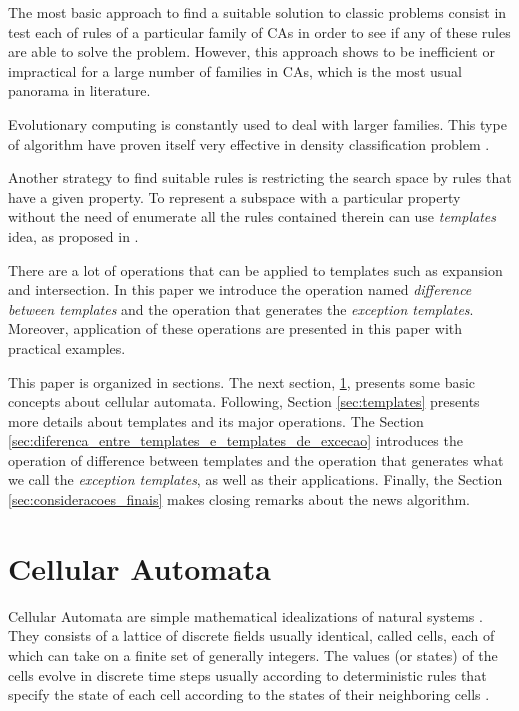 \documentclass{llncs}
\begin{document}
The most basic approach to find a suitable solution to classic problems consist in test each of rules of a particular family of CAs in order to see if any of these rules are able to solve the problem. However, this approach shows to be inefficient or impractical for a large number of families in CAs, which is the most usual panorama in literature.

Evolutionary computing is constantly used to deal with larger families. This type of algorithm have proven itself very effective in density classification problem \cite{wolz2008very}.

Another strategy to find suitable rules is restricting the search space by rules that have a given property. To represent a subspace with a particular property without the need of enumerate all the rules contained therein can use \textit{templates} idea, as proposed in \cite{deOliveira2014,deOliveira2014b}.

There are a lot of operations that can be applied to templates such as expansion and intersection. In this paper we introduce the operation named \textit{difference between templates} and the operation that generates the \textit{exception templates}. Moreover, application of these operations are presented in this paper with practical examples.

This paper is organized in sections. The next section, \ref{sec:automatos_celulares}, presents some basic concepts about cellular automata. Following, Section \ref{sec:templates} presents more details about templates and its major operations. The Section \ref{sec:diferenca_entre_templates_e_templates_de_excecao} introduces the operation of difference between templates and the operation that generates what we call the \textit{exception templates}, as well as their applications. Finally, the Section \ref{sec:consideracoes_finais} makes closing remarks about the news algorithm.

\section{Cellular Automata}
\label{sec:automatos_celulares}
Cellular Automata are simple mathematical idealizations of natural systems \cite{wolfram1994cellular}. They consists of a lattice of discrete fields usually identical, called cells, each of which can take on a finite set of generally integers. The values (or states) of the cells evolve in discrete time steps usually according to deterministic rules that specify the state of each cell according to the states of their neighboring cells \cite{wolfram1994cellular}.%
\end{document}
